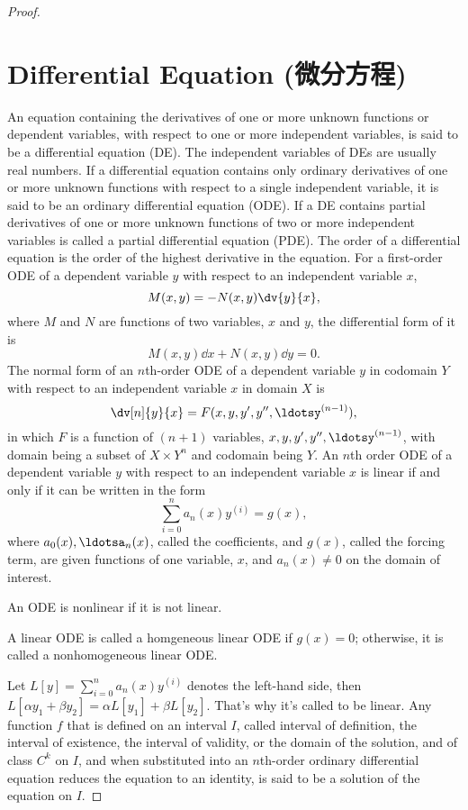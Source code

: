 \documentclass[a4paper,12pt]{report}
\begin{document}
\begin{proof}
{{{{{{\section{Differential Equation (微分方程)}
An equation containing the derivatives of one or more unknown functions or dependent variables, with respect to one or more independent variables, is said to be a differential equation (DE). The independent variables of DEs are usually real numbers.
If a differential equation contains only ordinary derivatives of one or more unknown functions with respect to a single independent variable, it is said to be an ordinary differential equation (ODE).
If a DE contains partial derivatives of one or more unknown functions of two or more independent variables is called a partial differential equation (PDE).
The order of a differential equation is the order of the highest derivative in the equation.
For a first-order ODE of a dependent variable $y$ with respect to an independent variable $x$,
\[M(x,y)=-N(x,y)\dv{y}{x},\]
where $M$ and $N$ are functions of two variables, $x$ and $y$, the differential form of it is
\[M(x,y)\dd{x}+N(x,y)\dd{y}=0.\]
The normal form of an $n$th-order ODE of a dependent variable $y$ in codomain $Y$ with respect to an independent variable $x$ in domain $X$ is
\[\dv[n]{y}{x}=F(x,y,y',y'',\ldotsy^{(n-1)}),\]
in which $F$ is a function of $(n+1)$ variables, $x,y,y',y'',\ldotsy^{(n-1)}$, with domain being a subset of $X\times Y^n$ and codomain being $Y$.
An $n$th order ODE of a dependent variable $y$ with respect to an independent variable $x$ is linear if and only if it can be written in the form
\[\sum_{i=0}^na_n(x)y^{(i)}=g(x),\]
where $a_0(x),\ldotsa_n(x)$, called the coefficients, and $g(x)$, called the forcing term, are given functions of one variable, $x$, and $a_n(x)\neq 0$ on the domain of interest.

An ODE is nonlinear if it is not linear.

A linear ODE is called a homgeneous linear ODE if $g(x)=0$; otherwise, it is called a nonhomogeneous linear ODE.

Let $L[y]=\sum_{i=0}^na_n(x)y^{(i)}$ denotes the left-hand side, then $L[\alpha y_1+\beta y_2]=\alpha L[y_1]+\beta L[y_2]$. That's why it's called to be linear.
Any function $f$ that is defined on an interval $I$, called interval of definition, the interval of existence, the interval of validity, or the domain of the solution, and of class $C^k$ on $I$, and when substituted into an $n$th-order ordinary differential equation reduces the equation to an identity, is said to be a solution of the equation on $I$.

}}}}}}
\end{proof}
\end{document}
